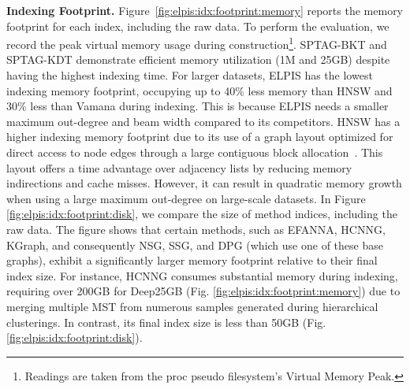\noindent\textbf{Indexing Footprint.}
Figure~\ref{fig:elpis:idx:footprint:memory} reports the memory footprint for each index, including the raw data. To perform the evaluation, we record the peak virtual memory usage during construction\footnote{Readings are taken from the proc pseudo filesystem’s Virtual Memory Peak.}. SPTAG-BKT and SPTAG-KDT demonstrate efficient memory utilization (1M and 25GB) despite having the highest indexing time. 
For larger datasets, ELPIS has the lowest indexing memory footprint, occupying up to 40\% less memory than HNSW and 30\% less than Vamana during indexing. This is because ELPIS needs a smaller maximum out-degree and beam width compared to its competitors.
HNSW has a higher indexing memory footprint due to its use of a graph layout optimized for direct access to node edges through a large contiguous block allocation~\cite{url/hnsw}. This layout offers a time advantage over adjacency lists by reducing memory indirections and cache misses. However, it can result in quadratic memory growth when using a large maximum out-degree on large-scale datasets.
In Figure \ref{fig:elpis:idx:footprint:disk}, we compare the size of method indices, including the raw data. The figure shows that certain methods, such as EFANNA, HCNNG, KGraph, and consequently NSG, SSG, and DPG (which use one of these base graphs), exhibit a significantly larger memory footprint relative to their final index size. For instance, HCNNG consumes substantial memory during indexing, requiring over 200GB for Deep25GB (Fig. \ref{fig:elpis:idx:footprint:memory}) due to merging multiple MST from numerous samples generated during hierarchical clusterings. In contrast, its final index size is less than 50GB (Fig. \ref{fig:elpis:idx:footprint:disk}).

